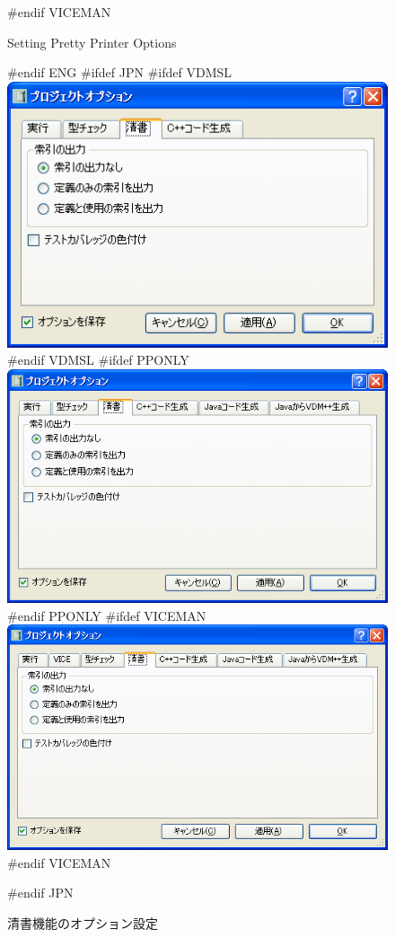 \documentclass[\pformat,12pt]{article}
\begin{document}
\begin{figure}[tbh]
\begin{center}
#endif VICEMAN
\caption{Setting Pretty Printer Options}
#endif ENG
#ifdef JPN
#ifdef VDMSL
\includegraphics[width=12cm]{ppOptions-sl.png}
#endif VDMSL
#ifdef PPONLY
\includegraphics[width=12cm]{ppOptions-pp.png}
#endif PPONLY
#ifdef VICEMAN
\includegraphics[width=12cm]{ppOptions-vice.png}
#endif VICEMAN
\caption{清書機能のオプション設定}
#endif JPN
\label{fig:optpp}
\end{center}
\end{figure}
\end{document}
